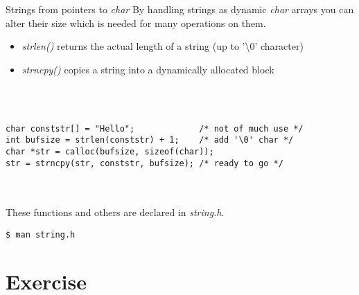 \begin{frame}[fragile]{Strings from pointers to \textit{char}}
	By handling strings as dynamic \textit{char} arrays you can alter their size which is needed for many operations on them.
	\begin{itemize}
		\item \textit{strlen()} returns the actual length of a string (up to '\textbackslash 0' character)
		\item \textit{strncpy()} copies a string into a dynamically allocated block
	\end{itemize}\ \\
	\ \\
	\begin{lstlisting}[numbers=none]
char conststr[] = "Hello";			   /* not of much use */
int bufsize = strlen(conststr) + 1;	   /* add '\0' char */
char *str = calloc(bufsize, sizeof(char));
str = strncpy(str, conststr, bufsize); /* ready to go */
\end{lstlisting}\ \\
	\ \\
	These functions and others are declared in \textit{string.h}.
	\begin{lstlisting}[numbers=none]
$ man string.h
\end{lstlisting}
\end{frame}
\section{Exercise}
